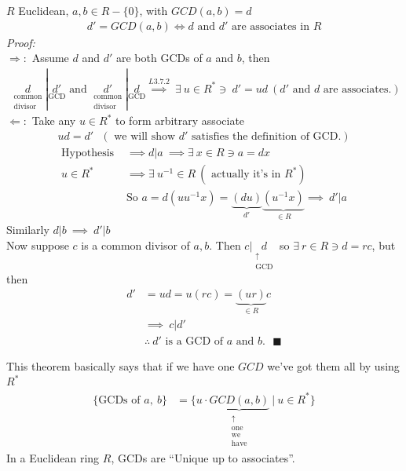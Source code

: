 \begin{theorem*}
    $R$ Euclidean, $a,b \in R-\{0\}$, with $GCD(a,b)=d$
    \begin{align*}
        d' =GCD(a,b) \iff d \text{ and }d' \text{ are associates in }R
    \end{align*}
    \textit{Proof:} \\ \steezybreak
    $\Rightarrow:$ Assume $d$ and $d'$ are both GCDs of $a$ and $b$, then
    \begin{align*}
        \underset{\substack{\text{common}\\ \text{divisor}}}{d}|\underset{\text{GCD}}{d'} \text{  and  } \underset{\substack{\text{common}\\ \text{divisor}}}{d'}|\underset{\text{GCD}}{d} \overset{L3.7.2}{\implies} \ \exists \ u \in R^* \ni \ d'=ud \ (d'\text{ and }d\text{ are associates.})
    \end{align*}
    $\Leftarrow:$ Take any $u\in R^*$ to form arbitrary associate
    \begin{align*}
        ud=d' \ \ \ (\text{ we will show }d' \text{ satisfies the definition of GCD.})
    \end{align*}
    \begin{align*}
        \text{Hypothesis }&\implies d|a \ \implies \exists \ x\in R \ni a= dx \\
        u \in R^* &\implies \exists \ u^{-1}\in R \ (\text{ actually it's in }R^*)\\
        &\text{So } a=d(uu^{-1}x) = \underbrace{(du)}_{d'}\underbrace{(u^{-1}x)}_{\in R} \implies \ d'|a
    \end{align*}
    Similarly $d|b \ \implies \ d'|b$\\
    Now suppose $c$ is a common divisor of $a,b$. Then
    $c|\underset{\substack{\uparrow \\ \text{GCD}}}{d}$ so $\exists \ r\in R \ni d=rc$, but then
    \begin{align*}
        d'&=ud=u(rc) = \underbrace{(ur)}_{\in R}c \\
        &\implies \ c|d' \\
        &\therefore \ d' \text{ is a GCD of }a \text{ and }b. \ \ \ \blacksquare
    \end{align*}
\end{theorem*}
This theorem basically says that if we have one $GCD$ we've got them all by using $R^*$
\begin{align*}
    \{\text{GCDs of }a,\ b\} &= \{u\cdot \underbrace{GCD(a,b)}_{\substack{\uparrow \\ \text{one}\\ \text{we} \\ \text{have}}} \ | \ u \in R^*\}
\end{align*}
In a Euclidean ring $R$, GCDs are ``Unique up to associates''.

